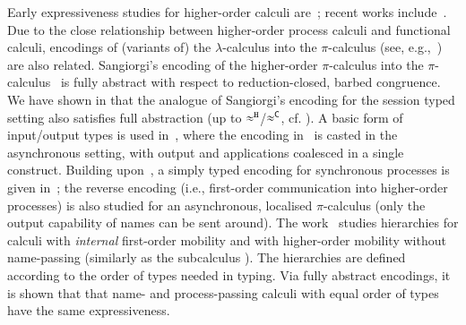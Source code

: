 \documentclass[preprint,11pt]{elsarticle}
\begin{document}
{{Early expressiveness studies for higher-order calculi are~\cite{Tho90,SangiorgiD:expmpa}; 
recent works include~\cite{BundgaardHG06,DBLP:conf/icalp/LanesePSS10,DBLP:journals/iandc/LanesePSS11,XuActa2012,DBLP:conf/wsfm/XuYL13}.
Due to the close relationship between higher-order process calculi and functional calculi, 
encodings of (variants of) the $\lambda$-calculus into the $\pi$-calculus (see, e.g.,~\cite{San92,DBLP:journals/tcs/Fu99,DBLP:journals/iandc/YoshidaBH04,BHY,DBLP:conf/concur/SangiorgiX14}) are also related.
Sangiorgi's encoding of the higher-order $\pi$-calculus
into the  $\pi$-calculus~\cite{SangiorgiD:expmpa} 
is fully abstract with respect to reduction-closed, barbed congruence. 
We have shown in  that the analogue of Sangiorgi's encoding for the session typed setting also satisfies full abstraction (up to $\approx^\mathtt{H}$/$\approx^\mathtt{C}$, cf. ).
A basic form of input/output types is used in~\cite{DBLP:journals/tcs/Sangiorgi01}, where the encoding in~\cite{SangiorgiD:expmpa} is casted in the asynchronous setting, with output and applications coalesced in a single construct. Building upon~\cite{DBLP:journals/tcs/Sangiorgi01}, 
a simply typed encoding for synchronous processes is given in~\cite{SaWabook}; the reverse encoding (i.e.,  first-order communication into higher-order processes) is also studied  for an asynchronous, localised $\pi$-calculus (only the output capability of names can be sent around).
The work~\cite{San96int} studies hierarchies for calculi with \emph{internal} first-order mobility and 
with higher-order mobility without name-passing (similarly as the subcalculus \HO). 
The hierarchies are
defined according to the order of types needed in typing.
Via fully abstract encodings, it is shown that that name- and process-passing calculi with equal order of types have the same expressiveness.


}}
\end{document}
